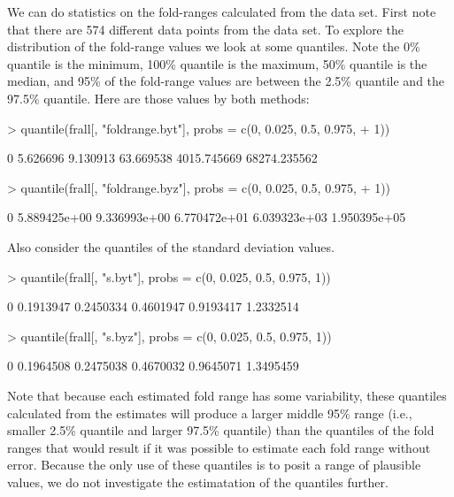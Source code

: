 \documentclass{article}[12pt]
\begin{document}
We can do statistics on the fold-ranges calculated from the data set. First note that there are 574 different 
data points from the data set. To explore the distribution of the fold-range values we look at some quantiles. Note the 0\% quantile is the minimum,
100\% quantile is the maximum, 50\% quantile is the median, and 95\% of the fold-range values are between the 2.5\% quantile and the 97.5\% quantile. 
Here are those values by both methods:
\begin{Schunk}
\begin{Sinput}
> quantile(frall[, "foldrange.byt"], probs = c(0, 0.025, 0.5, 0.975, 
+     1))
\end{Sinput}
\begin{Soutput}
          0%
    5.626696     9.130913    63.669538  4015.745669 68274.235562 
\end{Soutput}
\begin{Sinput}
> quantile(frall[, "foldrange.byz"], probs = c(0, 0.025, 0.5, 0.975, 
+     1))
\end{Sinput}
\begin{Soutput}
          0%
5.889425e+00 9.336993e+00 6.770472e+01 6.039323e+03 1.950395e+05 
\end{Soutput}
\end{Schunk}
Also consider the quantiles of the standard deviation values.
\begin{Schunk}
\begin{Sinput}
> quantile(frall[, "s.byt"], probs = c(0, 0.025, 0.5, 0.975, 1))
\end{Sinput}
\begin{Soutput}
       0%
0.1913947 0.2450334 0.4601947 0.9193417 1.2332514 
\end{Soutput}
\begin{Sinput}
> quantile(frall[, "s.byz"], probs = c(0, 0.025, 0.5, 0.975, 1))
\end{Sinput}
\begin{Soutput}
       0%
0.1964508 0.2475038 0.4670032 0.9645071 1.3495459 
\end{Soutput}
\end{Schunk}

Note that because each estimated fold range has some variability, these quantiles calculated from the estimates will produce 
a larger middle 95\% range (i.e., smaller 2.5\% quantile and larger 97.5\% quantile) 
than the quantiles of the fold ranges that would result if it was possible to estimate each fold 
range without error. Because the only use of these quantiles is to posit a range of plausible values, we do not investigate 
the estimatation of the quantiles further. 
\end{document}
